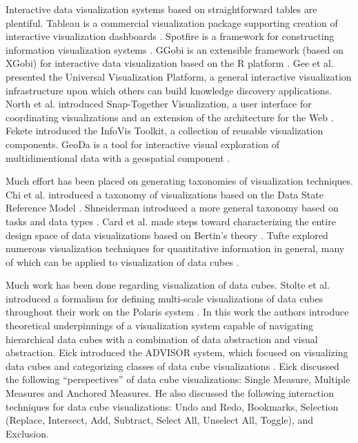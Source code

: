 Interactive data visualization systems based on straightforward tables are plentiful. Tableau is a commercial visualization package supporting creation of interactive visualization dashboards \cite{hanrahan2007visual}. Spotfire is a framework for constructing information visualization systems \cite{ahlberg1996spotfire}. GGobi is an extensible framework (based on XGobi) for interactive data visualization based on the R platform \cite{swayne2003ggobi, swayne1998xgobi}. Gee et al. presented the Universal Visualization Platform, a general interactive visualization infrastructure upon which others can build knowledge discovery applications. North et al. introduced Snap-Together Visualization, a user interface for coordinating visualizations \cite{north2000snap} and an extension of the architecture for the Web \cite{north2002visualization}. Fekete introduced the InfoVis Toolkit, a collection of reusable visualization components. GeoDa is a tool for interactive visual exploration of multidimentional data with a geospatial component \cite{anselin1999interactive}. 

Much effort has been placed on generating taxonomies of visualization techniques. Chi et al. introduced a taxonomy of visualizations based on the Data State Reference Model \cite{chi2000taxonomy, chi1998operator}. Shneiderman introduced a more general taxonomy based on tasks and data types \cite{shneiderman1996eyes}. Card et al. made steps toward characterizing the entire design space of data visualizations based on Bertin's theory \cite{card1997structure}. Tufte explored numerous visualization techniques for quantitative information in general, many of which can be applied to visualization of data cubes \cite{tufte1983visual}.

Much work has been done regarding visualization of data cubes. Stolte et al. introduced a formalism for defining multi-scale visualizations of data cubes throughout their work on the Polaris system \cite{stolte2003multiscale, stolte2002query, stolte2002polaris}. In this work the authors introduce theoretical underpinnings of a visualization system capable of navigating hierarchical data cubes with a combination of data abstraction and visual abstraction. Eick introduced the ADVISOR system, which focused on visualizing data cubes and categorizing classes of data cube visualizations \cite{eick2000visualizing}. Eick discussed the following ``perspectives'' of data cube visualizations: Single Measure, Multiple Measures and Anchored Measures. He also discussed the following interaction techniques for data cube visualizations: Undo and Redo, Bookmarks, Selection (Replace, Intersect, Add, Subtract, Select All, Unselect All, Toggle), and Exclusion.

